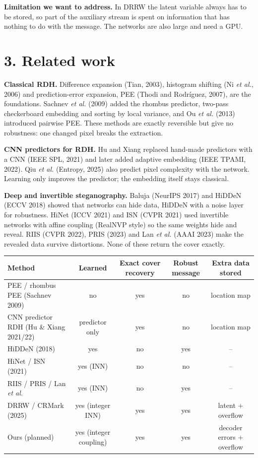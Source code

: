 \documentclass[10pt,a4paper]{article}
\begin{document}
\textbf{Limitation we want to address.} In DRRW the latent variable always has to be stored, so part of the auxiliary
stream is spent on information that has nothing to do with the message. The networks are also large and need a GPU.

\section*{3. Related work}
\textbf{Classical RDH.} Difference expansion (Tian, 2003), histogram shifting (Ni \emph{et al.}, 2006) and
prediction-error expansion, PEE (Thodi and Rodr\'iguez, 2007), are the foundations. Sachnev \emph{et al.} (2009) added
the rhombus predictor, two-pass checkerboard embedding and sorting by local variance, and Ou \emph{et al.} (2013)
introduced pairwise PEE. These methods are exactly reversible but give no robustness: one changed pixel breaks the
extraction.

\textbf{CNN predictors for RDH.} Hu and Xiang replaced hand-made predictors with a CNN (IEEE SPL, 2021) and later
added adaptive embedding (IEEE TPAMI, 2022). Qiu \emph{et al.} (Entropy, 2025) also predict pixel complexity with the
network. Learning only improves the predictor; the embedding itself stays classical.

\textbf{Deep and invertible steganography.} Baluja (NeurIPS 2017) and HiDDeN (ECCV 2018) showed that networks can hide
data, HiDDeN with a noise layer for robustness. HiNet (ICCV 2021) and ISN (CVPR 2021) used invertible networks with
affine coupling (RealNVP style) so the same weights hide and reveal. RIIS (CVPR 2022), PRIS (2023) and Lan \emph{et al.}
(AAAI 2023) make the revealed data survive distortions. None of these return the cover exactly.

\begin{center}
\small
\begin{tabular}{lcccc}
\hline
Method & Learned & Exact cover recovery & Robust message & Extra data stored \\
\hline
PEE / rhombus PEE (Sachnev 2009) & no & yes & no & location map \\
CNN predictor RDH (Hu \& Xiang 2021/22) & predictor only & yes & no & location map \\
HiDDeN (2018) & yes & no & yes & -- \\
HiNet / ISN (2021) & yes (INN) & no & no & -- \\
RIIS / PRIS / Lan \emph{et al.} & yes (INN) & no & yes & -- \\
DRRW / CRMark (2025) & yes (integer INN) & yes & yes & latent + overflow \\
Ours (planned) & yes (integer coupling) & yes & yes & decoder errors + overflow \\
\hline
\end{tabular}
\end{center}
\end{document}
